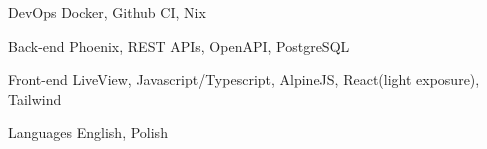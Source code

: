 

\begin{cvskills}

  \cvskill
    {DevOps} %
    {Docker, Github CI, Nix} %

  \cvskill
    {Back-end} %
    {Phoenix, REST APIs, OpenAPI, PostgreSQL} %

  \cvskill
    {Front-end} %
    {LiveView, Javascript/Typescript, AlpineJS, React(light exposure), Tailwind} %

  \cvskill
    {Languages} %
    {English, Polish} %

\end{cvskills}

